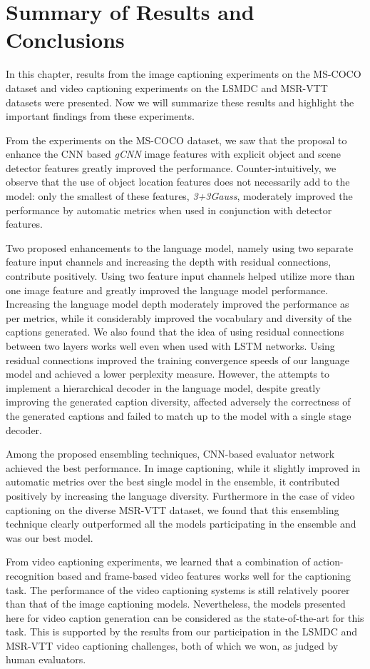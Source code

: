 \section{Summary of Results and Conclusions}
In this chapter, results from the image captioning experiments on the MS-COCO
dataset and video captioning experiments on the LSMDC and MSR-VTT datasets were
presented.
Now we will summarize these results and highlight the important findings from
these experiments.

From the experiments on the MS-COCO dataset, we saw that the proposal to enhance
the CNN based \emph{gCNN} image features with explicit object and scene detector
features greatly improved the performance. 
Counter-intuitively, we observe that the use of object location features does
not necessarily add to the model: only the smallest of these features,
\emph{3+3Gauss}, moderately improved the performance by automatic metrics when
used in conjunction with detector features.

Two proposed enhancements to the language model, namely using two separate
feature input channels and increasing the depth with residual connections,
contribute positively.
Using two feature input channels helped utilize more than one image feature and
greatly improved the language model performance.
Increasing the language model depth moderately improved the performance as per
metrics, while it considerably improved the vocabulary and diversity of the
captions generated.
We also found that the idea of using residual connections between two layers
works well even when used with LSTM networks.
Using residual connections improved the training convergence speeds of our
language model and achieved a lower perplexity measure.
However, the attempts to implement a hierarchical decoder in the language model,
despite greatly improving the generated caption diversity, affected adversely 
the correctness of the generated captions and failed to match up to the model
with a single stage decoder.

Among the proposed ensembling techniques, CNN-based evaluator network achieved
the best performance.
In image captioning, while it slightly improved in automatic metrics over the
best single model in the ensemble, it contributed positively by increasing the
language diversity. 
Furthermore in the case of video captioning on the diverse MSR-VTT dataset, we
found that this ensembling technique clearly outperformed all the models
participating in the ensemble and was our best model.

From video captioning experiments, we learned that a combination of action-
recognition based and frame-based video features works well for the captioning
task.
The performance of the video captioning systems is still relatively poorer than
that of the image captioning models.
Nevertheless, the models presented here for video caption generation can be
considered as the state-of-the-art for this task.
This is supported by the results from our participation in the LSMDC and MSR-VTT
video captioning challenges, both of which we won, as judged by human
evaluators.

